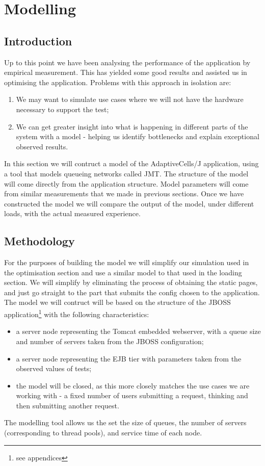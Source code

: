 \chapter{Modelling}

\section{Introduction}

Up to this point we have been analysing the performance of the application by empirical measurement. This has yielded some good results and assisted us in optimising the application. Problems with this approach in isolation are:

\begin{enumerate}
 \item We may want to simulate use cases where we will not have the hardware necessary to support the test;
 \item We can get greater insight into what is happening in different parts of the system with a model - helping us identify bottlenecks and explain exceptional observed results.
\end{enumerate}

In this section we will contruct a model of the AdaptiveCells/J application, using a tool that models queueing networks called JMT. The structure of the model will come directly from the application structure. Model parameters will come from similar measurements that we made in previous sections. Once we have constructed the model we will compare the output of the model, under different loads, with the actual measured experience.

\section{Methodology}

For the purposes of building the model we will simplify our simulation used in the optimisation section and use a similar model to that used in the loading section. We will simplify by eliminating the process of obtaining the static pages, and just go straight to the part that submits the config chosen to the application.
The model we will contruct will be based on the structure of the JBOSS application\footnote{see appendices} with the following characteristics:

\begin{itemize}
 \item a server node representing the Tomcat embedded webserver, with a queue size and number of servers taken from the JBOSS configuration;
 \item a server node representing the EJB tier with parameters taken from the observed values of tests;
 \item the model will be closed, as this more closely matches the use cases we are working with - a fixed number of users submitting a request, thinking and then submitting another request.
\end{itemize}

The modelling tool allows us the set the size of queues, the number of servers (corresponding to thread pools), and service time of each node. 
